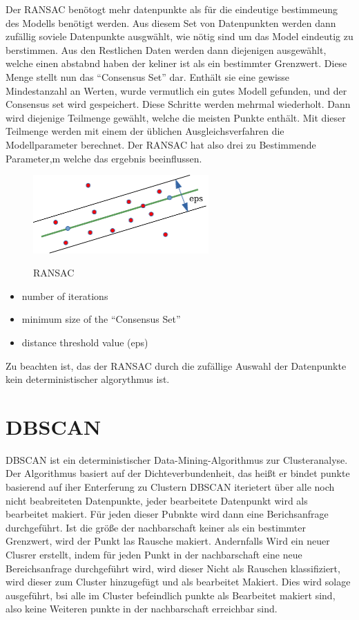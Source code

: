 Der \ac{RANSAC} benötogt mehr datenpunkte als für die eindeutige bestimmeung des Modells benötigt werden. Aus diesem Set von Datenpunkten werden dann zufällig soviele Datenpunkte ausgwählt, wie nötig sind um das Model eindeutig zu berstimmen.
Aus den Restlichen Daten werden dann diejenigen ausgewählt, welche einen abstabnd haben der keliner ist als ein bestimmter Grenzwert. Diese Menge stellt nun das ``Consensus Set'' dar.  Enthält sie eine gewisse Mindestanzahl an Werten, wurde vermutlich ein gutes Modell gefunden, und der Consensus set wird gespeichert.
Diese Schritte werden mehrmal wiederholt. Dann wird diejenige Teilmenge gewählt, welche die meisten Punkte enthält. Mit dieser Teilmenge werden mit einem der üblichen Ausgleichsverfahren die Modellparameter berechnet.
Der \ac{RANSAC} hat also drei zu Bestimmende Parameter,m welche das ergebnis beeinflussen.

\begin{figure}[!ht]
\begin{center}
\caption{\acs{RANSAC} \cite{Fischler1981}}
\includegraphics[width=0.6\textwidth]{bilder/ransac.pdf}
\label{platform}
\end{center}
\end{figure}


\begin{itemize}
 \item number of iterations
 \item minimum size of the ``Consensus Set''
 \item distance threshold value (eps)
\end{itemize}

Zu beachten ist, das der \ac{RANSAC} durch die zufällige Auswahl der Datenpunkte kein deterministischer algorythmus ist.


\section{\acl{DBSCAN}}
\ac{DBSCAN} \cite{DBSCAN} ist ein deterministischer Data-Mining-Algorithmus zur Clusteranalyse. Der Algorithmus basiert auf der Dichteverbundenheit, das heißt er bindet punkte basierend auf iher Enterferung zu Clustern
\ac{DBSCAN} iterietert über alle  noch nicht beabreiteten Datenpunkte, jeder bearbeitete Datenpunkt wird als bearbeitet makiert. Für jeden dieser Pubnkte wird dann eine Berichsanfrage durchgeführt.
Ist die größe der nachbarschaft keiner als ein bestimmter Grenzwert, wird der Punkt las Rausche makiert. Andernfalls Wird ein neuer Clusrer erstellt, indem für jeden Punkt in
der nachbarschaft eine neue Bereichsanfrage durchgeführt wird, wird dieser Nicht als Rauschen klassifiziert, wird dieser zum Cluster hinzugefügt und als bearbeitet Makiert.
Dies wird solage ausgeführt, bsi alle im Cluster befeindlich punkte als Bearbeitet makiert sind, also keine Weiteren punkte in der nachbarschaft erreichbar sind.

